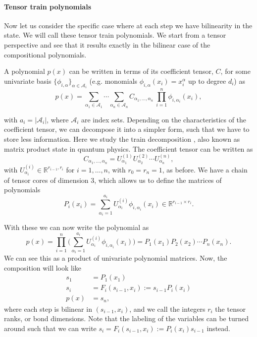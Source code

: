 \documentclass[11pt,a4paper]{article}
\newcommand{\R}{\mathbb R}
\theoremstyle{definition}
\begin{document}
\paragraph{Tensor train polynomials} Now let us consider the specific case where at each step we have bilinearity in the state. We will call these tensor train polynomials. We start from a tensor perspective and see that it results exactly in the bilinear case of the compositional polynomials. 

A polynomial $p(x)$ can be written in terms of its coefficient tensor, $C$, for some univariate basis $\{\phi_{i,\alpha}\}_{\alpha\in \mathcal{A}_i}$ (e.g. monomials $\phi_{i,\alpha}(x_i)=x_i^{\alpha}$ up to degree $d_i$) as
\begin{equation}
  p(x)=\sum_{\alpha_1\in\mathcal A_1}\cdots\sum_{\alpha_n\in\mathcal A_n}
  C_{\alpha_1,\dots,\alpha_n}\ \prod_{i=1}^n \phi_{i,\alpha_i}(x_i),
\end{equation}

with $a_i=|\mathcal{A}_i|$, where $\mathcal{A}_i$ are index sets. Depending on the characteristics of the coefficient tensor, we can decompose it into a simpler form, such that we have to store less information. Here we study the train decomposition \cite{oseledets2011tensor,dolgov2013tensor}, also known as matrix product state in quantum physics. The coefficient tensor can be written as 
\begin{equation}
    C_{\alpha_1,\dots,\alpha_n}= U^{(1)}_{\alpha_1}U^{(2)}_{\alpha_2}\cdots U^{(n)}_{\alpha_n}, 
\end{equation}
with $U^{(i)}_{\alpha_i}\in \R^{r_{i-1},r_{i}}$ for $i=1,\dots,n$, with $r_0=r_n=1$, as before. We have a chain of tensor cores of dimension 3, which allows us to define the matrices of polynomials
\begin{equation}\label{eq:Pi}
    P_i(x_i) = \sum_{\alpha_i=1}^{a_i}U^{(i)}_{\alpha_i}\phi_{i,\alpha_i}(x_i) \in \R^{r_{i-1}\times r_i}.
\end{equation}

With these we can now write the polynomial as
\begin{equation}
    p(x)=\prod_{i=1}^n \Bigg(\sum_{\alpha_i=1}^{a_i}U^{(i)}_{\alpha_i}\phi_{i,\alpha_i}(x_i)\Bigg) =  P_1(x_1)P_2(x_2)\cdots P_n(x_n).
\end{equation}
We can see this as a product of univariate polynomial matrices. Now, the composition will look like
\begin{align*}
    s_1 &=P_1(x_1) \\
    s_i & = F_i(s_{i-1},x_i) := s_{i-1}P_i(x_i) \\
    p(x)&=s_n,
\end{align*}
where each step is bilinear in $(s_{i-1},x_i)$, and we call the integers $r_i$ the tensor ranks, or bond dimensions. Note that the labeling of the variables can be turned around such that we can write $s_i = F_i(s_{i-1},x_i) := P_i(x_i)s_{i-1}$ instead.
\end{document}
